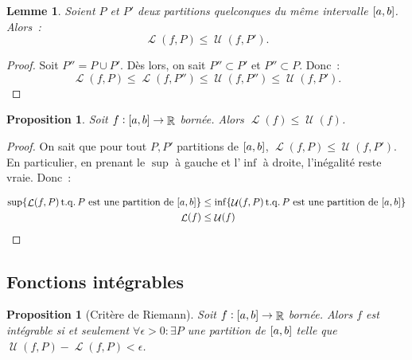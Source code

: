 \documentclass{article}
\DeclareMathOperator{\R}{\mathbb R}
\DeclareMathOperator{\tq}{ t.q. }
\DeclareMathOperator{\Larea}{\mathcal L}
\DeclareMathOperator{\Uarea}{\mathcal U}
\newcommand{\ab}{\interval ab}
\newcommand{\fabr}[1]{#1 : \ab \to \R}
\newtheorem{prp}[thm]{Proposition}
\newtheorem{lem}[thm]{Lemme}
\theoremstyle{definition}
\theoremstyle{remark}
\begin{document}
		\begin{lem} Soient $P$ et $P'$ deux partitions quelconques du même intervalle $\ab$. Alors~:
		\[\Larea(f, P) \leq \Uarea(f, P').\]
		\end{lem}

		\begin{proof} Soit $P'' = P \cup P'$. Dès lors, on sait $P'' \subset P'$ et $P'' \subset P$. Donc~:
		\[\Larea(f, P) \leq \Larea(f, P'') \leq \Uarea(f, P'') \leq \Uarea(f, P').\]
		\end{proof}

		\begin{prp} Soit $\fabr f$ bornée. Alors $\Larea(f) \leq \Uarea(f)$. \end{prp}

		\begin{proof} On sait que pour tout $P, P'$ partitions de $\ab$, $\Larea(f, P) \leq \Uarea(f, P')$. En particulier, en prenant le $\sup$
		à gauche et l'$\inf$ à droite, l'inégalité reste vraie. Donc~:

		\begin{align*}
			\sup \{\Larea(f, P) \tq P \text{ est une partition de } \ab\} &\leq \inf \{\Uarea(f, P) \tq P \text{ est une partition de } \ab\} \\
			\Larea(f) &\leq \Uarea(f)
		\end{align*}
		\end{proof}

	\subsection{Fonctions intégrables}
		\begin{prp}[Critère de Riemann] Soit $\fabr f$ bornée. Alors $f$ est intégrable si et seulement $\forall \epsilon > 0 : \exists P$ une partition
		de $\ab$ telle que $\Uarea(f, P) - \Larea(f, P) < \epsilon$. \end{prp}
\end{document}
